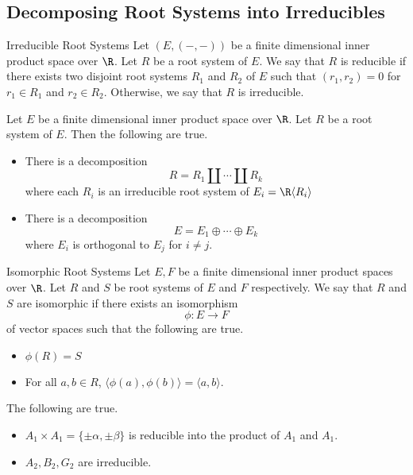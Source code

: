 \documentclass[a4paper]{article}
\begin{document}
\subsection{Decomposing Root Systems into Irreducibles}
\begin{defn}{Irreducible Root Systems}{} Let $(E,(-,-))$ be a finite dimensional inner product space over $\R$. Let $R$ be a root system of $E$. We say that $R$ is reducible if there exists two disjoint root systems $R_1$ and $R_2$ of $E$ such that $(r_1,r_2)=0$ for $r_1\in R_1$ and $r_2\in R_2$. Otherwise, we say that $R$ is irreducible. 
\end{defn}

\begin{prp}{}{} Let $E$ be a finite dimensional inner product space over $\R$. Let $R$ be a root system of $E$. Then the following are true. 
\begin{itemize}
\item There is a decomposition $$R=R_1\amalg\cdots\amalg R_k$$ where each $R_i$ is an irreducible root system of $E_i=\R\langle R_i\rangle$
\item There is a decomposition $$E=E_1\oplus\cdots\oplus E_k$$ where $E_i$ is orthogonal to $E_j$ for $i\neq j$. 
\end{itemize}
\end{prp}

\begin{defn}{Isomorphic Root Systems}{} Let $E,F$ be a finite dimensional inner product spaces over $\R$. Let $R$ and $S$ be root systems of $E$ and $F$ respectively. We say that $R$ and $S$ are isomorphic if there exists an isomorphism $$\phi:E\to F$$ of vector spaces such that the following are true. 
\begin{itemize}
\item $\phi(R)=S$
\item For all $a,b\in R$, $\langle\phi(a),\phi(b)\rangle=\langle a,b\rangle$. 
\end{itemize}
\end{defn}

\begin{eg}{}{} The following are true. 
\begin{itemize}
\item $A_1\times A_1=\{\pm\alpha,\pm\beta\}$ is reducible into the product of $A_1$ and $A_1$. 
\item $A_2,B_2,G_2$ are irreducible. 
\end{itemize}
\end{eg}
\end{document}
